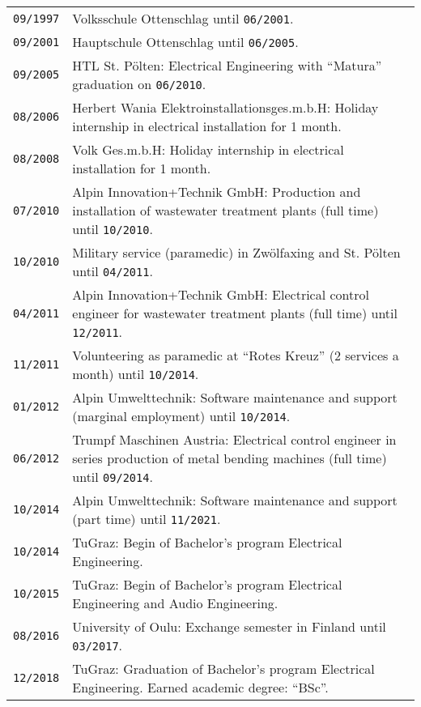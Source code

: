 {
\vspace*{0.75cm}
\\\\
\begin{tabularx}{\columnwidth}{>{\centering\arraybackslash}p{1.5cm} | p{12cm}}
  \texttt{09/1997} & Volksschule Ottenschlag until \texttt{06/2001}.\\
  \texttt{09/2001} & Hauptschule Ottenschlag until \texttt{06/2005}.\\
  \texttt{09/2005} & HTL St. Pölten: Electrical Engineering with \enquote{Matura} graduation on \texttt{06/2010}.\\
  \texttt{08/2006} & Herbert Wania Elektroinstallationsges.m.b.H: Holiday internship in electrical installation for 1 month.\\
  \texttt{08/2008} & Volk Ges.m.b.H: Holiday internship in electrical installation for 1 month.\\
  \texttt{07/2010} & Alpin Innovation+Technik GmbH: Production and installation of wastewater treatment plants (full time) until \texttt{10/2010}.\\
  \texttt{10/2010} & Military service (paramedic) in Zwölfaxing and St. Pölten until \texttt{04/2011}.\\
  \texttt{04/2011} & Alpin Innovation+Technik GmbH: Electrical control engineer for wastewater treatment plants (full time) until \texttt{12/2011}.\\
  \texttt{11/2011} & Volunteering as paramedic at \enquote{Rotes Kreuz} (2 services a month) until \texttt{10/2014}.\\
  \texttt{01/2012} & Alpin Umwelttechnik: Software maintenance and support (marginal employment) until \texttt{10/2014}.\\
  \texttt{06/2012} & Trumpf Maschinen Austria: Electrical control engineer in series production of metal bending machines (full time) until \texttt{09/2014}.\\
  \texttt{10/2014} & Alpin Umwelttechnik: Software maintenance and support (part time) until \texttt{11/2021}.\\
  \texttt{10/2014} & TuGraz: Begin of Bachelor's program Electrical Engineering.\\
  \texttt{10/2015} & TuGraz: Begin of Bachelor's program Electrical Engineering and Audio Engineering.\\
  \texttt{08/2016} & University of Oulu: Exchange semester in Finland until \texttt{03/2017}.\\
  \texttt{12/2018} & TuGraz: Graduation of Bachelor's program Electrical Engineering. Earned academic degree: \enquote{BSc}.\\

\end{tabularx}}
